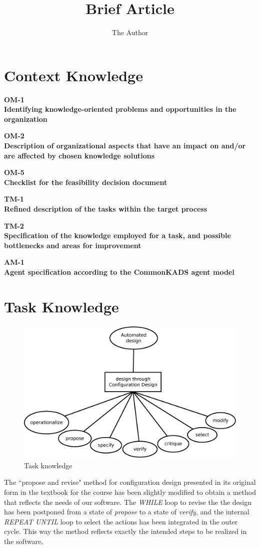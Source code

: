 \documentclass[11pt]{article} %
\title{Brief Article}
\author{The Author}
\def\worksheet#1#2{%
  \clearpage
  
  \begin{center}
  {\large\bf #1} \\
  {\normalsize\bf #2} \\[12pt]
  \begin{footnotesize}
  
  \end{footnotesize}
  \end{center}  
  \vfill}
\begin{document}
\maketitle


\section{Context Knowledge}
\worksheet{OM-1}{Identifying knowledge-oriented problems and
opportunities in the organization}

\worksheet{OM-2}{Description of organizational aspects that
have an impact on and/or are affected by chosen knowledge solutions}

\worksheet{OM-5}{Checklist for the feasibility decision
document}

\worksheet{TM-1}{Refined description of the tasks within the
target process}

\worksheet{TM-2}{Specification of the knowledge employed for a
task, and possible bottlenecks and areas for improvement}

\worksheet{AM-1}{Agent specification according to the
CommonKADS agent model}

\section{Task Knowledge}

\begin{figure}[h]
\centering
\includegraphics[height=7cm]{images/task_knowledge.eps}
\caption{Task knowledge}
\label{fig:taskknowledge}
\end{figure}

The ``propose and revise" method for configuration design presented in its original form in the textbook for the course has been slightly modified to obtain a method that reflects the needs of our software. The \textit{WHILE} loop to revise the the design has been postponed from a state of \textit{propose} to a state of \textit{verify}, and the internal \textit{REPEAT UNTIL} loop to select the actions has been integrated in the outer cycle. This way the method reflects exactly the intended steps to be realized in the software. 
\end{document}
